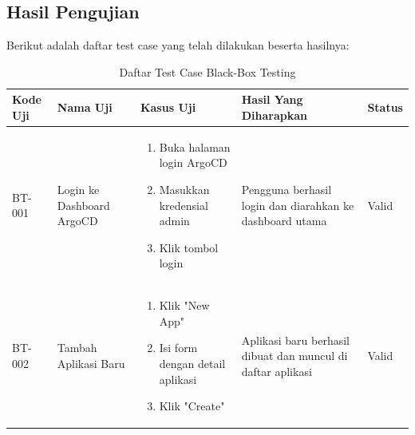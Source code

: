 \subsection{Hasil Pengujian}\label{subsec:hasil_pengujian}
Berikut adalah daftar test case yang telah dilakukan beserta hasilnya:
\begin{table}[h]
  \centering
  \caption{Daftar Test Case Black-Box Testing}
  \label{tab:test-case}
  \small
  \begin{adjustbox}{width=\textwidth}
    \begin{tabular}{|p{0.8cm}|p{2.2cm}|p{4cm}|p{3.5cm}|p{1.2cm}|}
      \hline
      \textbf{Kode Uji} & \textbf{Nama Uji}         & \textbf{Kasus Uji}                                                             & \textbf{Hasil Yang Diharapkan}                                     & \textbf{Status} \\
      \hline
      BT-001            & Login ke Dashboard ArgoCD & \begin{enumerate}[leftmargin=*,noitemsep,topsep=0pt,label=\arabic*.,widest=99]
                                                        \item Buka halaman login ArgoCD
                                                        \item Masukkan kredensial admin
                                                        \item Klik tombol login
                                                      \end{enumerate} & Pengguna berhasil login dan diarahkan ke dashboard utama           & Valid                                                                          \\ \hline
      BT-002            & Tambah Aplikasi Baru      & \begin{enumerate}[leftmargin=*,noitemsep,topsep=0pt,label=\arabic*.,widest=99]
                                                        \item Klik "New App"
                                                        \item Isi form dengan detail aplikasi
                                                        \item Klik "Create"
                                                      \end{enumerate} & Aplikasi baru berhasil dibuat dan muncul di daftar aplikasi        & Valid                                                                          \\ \hline

\end{tabular}
\end{adjustbox}
\end{table}
